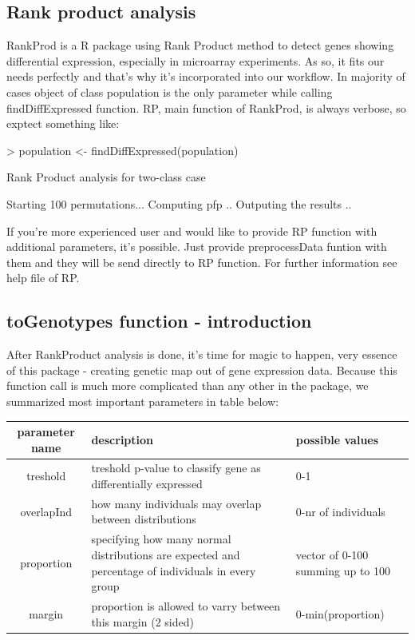\documentclass{article}
\begin{document}
\subsection{Rank product analysis}
RankProd \citep{Hong:2006} is a R package using Rank Product \citep{Breitling200483} method to detect genes showing differential expression, especially in microarray experiments. As so, it fits our needs perfectly and that's why it's incorporated into our workflow. 
In majority of cases object of class population is the only parameter while calling findDiffExpressed function. RP, main function of RankProd, is always verbose, so exptect something like:
\begin{Schunk}
\begin{Sinput}
> population <- findDiffExpressed(population)
\end{Sinput}
\begin{Soutput}
Rank Product analysis for two-class case 
 
Starting 100 permutations... 
Computing pfp .. 
Outputing the results .. 
\end{Soutput}
\end{Schunk}

{\noindent}If you're more experienced user and would like to provide RP function with additional parameters, it's possible. Just provide preprocessData funtion with them and they will be send directly to RP function. For further information see help file of RP.

\subsection{toGenotypes function - introduction}
After RankProduct analysis is done, it's time for magic to happen,  very essence of this package - creating genetic map out of gene expression data. Because this function call is much more complicated than any other in the 
package, we summarized most important parameters in table below:

 \begin{tabular}{ | c | p{5.5cm} | p{4.5cm}| }
  \hline                       
  parameter name & description & possible values \\ \hline
  treshold & treshold p-value to classify gene as differentially expressed & 0-1 \\ \hline
  overlapInd & how many individuals may overlap between distributions & 0-nr of individuals  \\ \hline
  proportion & specifying how many normal distributions are expected and percentage of individuals in every group  & vector of 0-100 summing up to 100  \\ \hline
  margin & proportion is allowed to varry between this margin (2 sided)  & 0-min(proportion) \\ \hline
\end{tabular}
\end{document}
